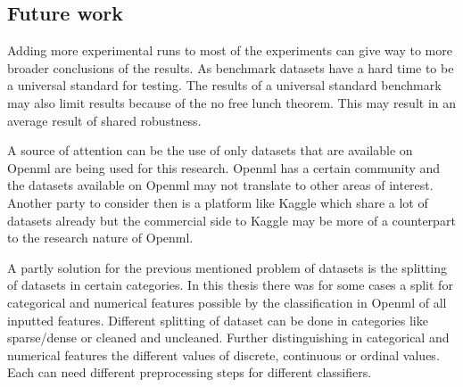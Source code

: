 \documentclass[a4paper,10pt]{article}
\begin{document}




\subsection{Future work}
Adding more experimental runs to most of the experiments can give way to more broader conclusions of the results. As benchmark datasets have a hard time to be a universal standard for testing. The results of a universal standard benchmark may also limit results because of the no free lunch theorem. This may result in an average result of shared robustness.

A source of attention can be the use of only datasets that are available on Openml are being used for this research. Openml has a certain community and the datasets available on Openml may not translate to other areas of interest. Another party to consider then is a platform like Kaggle which share a lot of datasets already but the commercial side to Kaggle may be more of a counterpart to the research nature of Openml. 

A partly solution for the previous mentioned problem of datasets is the splitting of datasets in certain categories. In this thesis there was for some cases a split for categorical and numerical features possible by the classification in Openml of all inputted features. Different splitting of dataset can be done in categories like sparse/dense or cleaned and uncleaned. Further distinguishing in categorical and numerical features the different values of discrete, continuous or ordinal values. Each can need different preprocessing steps for different classifiers. 





\newpage
\end{document}
